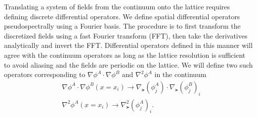 



Translating a system of fields from the continuum onto the lattice requires defining discrete differential operators.
We define spatial differential operators pseudospectrally using a Fourier basis.
The procedure is to first transform the discretized fields using a fast Fourier transform (FFT), then take the derivatives analytically and invert the FFT.
Differential operators defined in this manner will agree with the continuum operators as long as the lattice resolution is sufficient to avoid aliasing and the fields are periodic on the lattice.
We will define two such operators corresponding to $\nabla\phi^A\cdot\nabla\phi^B$ and $\nabla^2\phi^A$ in the continuum
\begin{align}
  & \nabla\phi^A\cdot\nabla\phi^B(x=x_i) \to \nabla_\lat(\phi^A_j)\cdot\nabla_\lat(\phi^B_j)_i \\
  & \nabla^2\phi^A(x=x_i) \to \nabla^2_\lat(\phi^A_j)_i.
\end{align}

